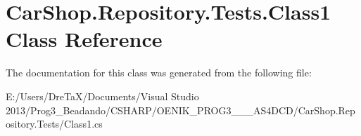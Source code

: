 \hypertarget{class_car_shop_1_1_repository_1_1_tests_1_1_class1}{}\section{Car\+Shop.\+Repository.\+Tests.\+Class1 Class Reference}
\label{class_car_shop_1_1_repository_1_1_tests_1_1_class1}


The documentation for this class was generated from the following file\+:\begin{DoxyCompactItemize}
\item 
E\+:/\+Users/\+Dre\+Ta\+X/\+Documents/\+Visual Studio 2013/\+Prog3\+\_\+\+Beadando/\+C\+S\+H\+A\+R\+P/\+O\+E\+N\+I\+K\+\_\+\+P\+R\+O\+G3\+\_\+\_\+\_\+\+A\+S4\+D\+C\+D/\+Car\+Shop.\+Repository.\+Tests/Class1.\+cs\end{DoxyCompactItemize}
